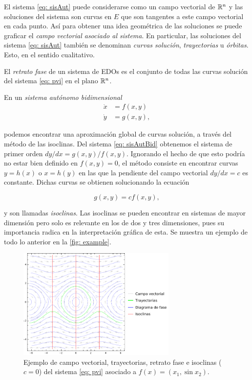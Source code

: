 El sistema \eqref{eq: sisAut} puede considerarse como un campo vectorial de ${\mathbb{R}}^{n}$ y las soluciones del sistema son curvas en $E$ que son tangentes a este campo vectorial en cada punto. Así para obtener una idea geométrica de las soluciones se puede graficar el \textit{campo vectorial asociado al sistema}. En particular, las soluciones del sistema \eqref{eq: sisAut} también se denominan \textit{curvas solución}, \textit{trayectorias} u \textit{órbitas}. Esto, en el sentido cualitativo.

El \textit{retrato fase} de un sistema de EDOs es el conjunto de todas las curvas solución del sistema \eqref{eq: pvi} en el plano ${\mathbb{R}}^{n}$.

En un \textit{sistema autónomo bidimensional}
\begin{equation}
	\begin{aligned}
		\dot{x} &= f(x, y) \\
		\dot{y} &= g(x, y),
	\end{aligned}
	\label{eq: sisAutBid}
\end{equation}

podemos encontrar una aproximación global de curvas solución, a través del método de las isoclinas. Del sistema \eqref{eq: sisAutBid} obtenemos el sistema de primer orden $dy/dx = g(x, y)/f(x, y)$. Ignorando el hecho de que esto podría no estar bien definido en $f(x, y) = 0$, el método consiste en encontrar curvas $y=h(x)$ o $x=h(y)$ en las que la pendiente del campo vectorial $dy/dx = c$ es constante. Dichas curvas se obtienen solucionando la ecuación

\begin{equation*}
	g(x, y) = cf(x, y),
	\label{eq: pendiente}
\end{equation*}

y son llamadas \textit{isoclinas}. Las isoclinas se pueden encontrar en sistemas de mayor dimensión pero solo es relevante en los de dos y tres dimensiones, pues su importancia radica en la interpretación gráfica de esta. Se muestra un ejemplo de todo lo anterior en la \autoref{fig: example}.

\begin{figure}
	\centering
	\includegraphics[width=0.7\textwidth]{img/Example.pdf}
	\caption{Ejemplo de campo vectorial, trayectorias, retrato fase e isoclinas ($c=0$) del sistema \eqref{eq: pvi} asociado a $f(x)=(x_{1},\sin{x_{2}})$.}
	\label{fig: example}
\end{figure}

